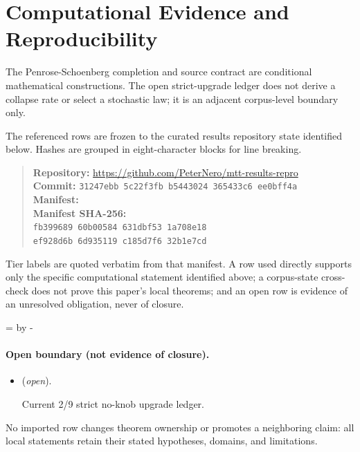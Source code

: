 \documentclass[11pt]{article}
\begin{document}
\section*{Computational Evidence and Reproducibility}
The Penrose-Schoenberg completion and source contract are conditional mathematical constructions. The open strict-upgrade ledger does not derive a collapse rate or select a stochastic law; it is an adjacent corpus-level boundary only.

The referenced rows are frozen to the curated results repository state identified below. Hashes are grouped in eight-character blocks for line breaking.
\begin{quote}\small
\textbf{Repository:} \url{https://github.com/PeterNero/mtt-results-repro}\\
\textbf{Commit:} \texttt{31247ebb 5c22f3fb b5443024 365433c6 ee0bff4a}\\
\textbf{Manifest:} \\
\textbf{Manifest SHA-256:}\\
\texttt{fb399689 60b00584 631dbf53 1a708e18}\\
\texttt{ef928d6b 6d935119 c185d7f6 32b1e7cd}
\end{quote}

Tier labels are quoted verbatim from that manifest. A row used directly supports only the specific computational statement identified above; a corpus-state cross-check does not prove this paper's local theorems; and an open row is evidence of an unresolved obligation, never of closure.

\par\begingroup{}=\pagegoal\advance{} by -\pagetotal\ifdim\dimen0<7\baselineskip\newpage\fi\endgroup
\paragraph{Open boundary (not evidence of closure).}
\begin{itemize}
\setlength{\itemsep}{0.25em}
\item {} (\emph{open}).\par Current 2/9 strict no-knob upgrade ledger.
\end{itemize}

No imported row changes theorem ownership or promotes a neighboring claim: all local statements retain their stated hypotheses, domains, and limitations.
\end{document}
